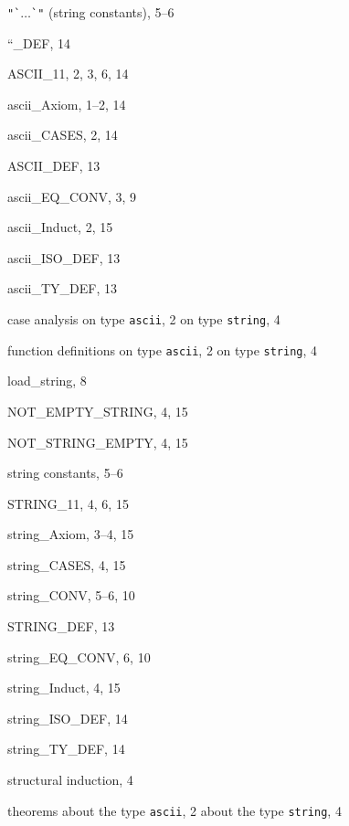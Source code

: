 \begin{theindex}

  \item \verb+"`+$\dots$\verb+`"+ (string constants), 5--6
  \item {\ptt ``\_DEF}, 14

  \indexspace

  \item {\ptt ASCII\_11}, 2, 3, 6, 14
  \item {\ptt ascii\_Axiom}, 1--2, 14
  \item {\ptt ascii\_CASES}, 2, 14
  \item {\ptt ASCII\_DEF}, 13
  \item {\ptt ascii\_EQ\_CONV}, 3, 9
  \item {\ptt ascii\_Induct}, 2, 15
  \item {\ptt ascii\_ISO\_DEF}, 13
  \item {\ptt ascii\_TY\_DEF}, 13

  \indexspace

  \item case analysis
    \subitem on type {\tt ascii}, 2
    \subitem on type {\tt string}, 4

  \indexspace

  \item function definitions
    \subitem on type {\tt ascii}, 2
    \subitem on type {\tt string}, 4

  \indexspace

  \item {\ptt load\_string}, 8

  \indexspace

  \item {\ptt NOT\_EMPTY\_STRING}, 4, 15
  \item {\ptt NOT\_STRING\_EMPTY}, 4, 15

  \indexspace

  \item string constants, 5--6
  \item {\ptt STRING\_11}, 4, 6, 15
  \item {\ptt string\_Axiom}, 3--4, 15
  \item {\ptt string\_CASES}, 4, 15
  \item {\ptt string\_CONV}, 5--6, 10
  \item {\ptt STRING\_DEF}, 13
  \item {\ptt string\_EQ\_CONV}, 6, 10
  \item {\ptt string\_Induct}, 4, 15
  \item {\ptt string\_ISO\_DEF}, 14
  \item {\ptt string\_TY\_DEF}, 14
  \item structural induction, 4

  \indexspace

  \item theorems
    \subitem about the type {\tt ascii}, 2
    \subitem about the type {\tt string}, 4

\end{theindex}
